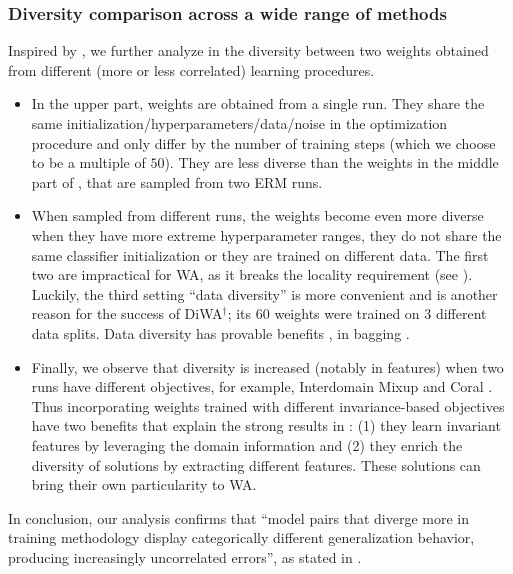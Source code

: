 \subsubsection{Diversity comparison across a wide range of methods}
\label{app:more_diversity_comparison}
Inspired by \cite{gontijolopes2022no}, we further analyze in  the diversity between two weights obtained from different (more or less correlated) learning procedures.
\begin{itemize}
    \item In the upper part, weights are obtained from a single run. They share the same initialization/hyperparameters/data/noise in the optimization procedure and only differ by the number of training steps (which we choose to be a multiple of $50$). They are less diverse than the weights in the middle part of , that are sampled from two ERM runs.
    \item  When sampled from different runs, the weights become even more diverse when they have more extreme hyperparameter ranges, they do not share the same classifier initialization or they are trained on different data. The first two are impractical for WA, as it breaks the locality requirement (see ).
          Luckily, the third setting \enquote{data diversity} is more convenient and is another reason for the success of DiWA$^{\dagger}$; its $60$ weights were trained on $3$ different data splits. Data diversity has provable benefits \cite{efron1992bootstrap}, \eg in bagging \cite{breiman1996bagging}.
    \item Finally, we observe that diversity is increased (notably in features) when two runs have different objectives, for example, Interdomain Mixup \cite{yan2020improve} and Coral \cite{coral216aaai}. Thus incorporating weights trained with different invariance-based objectives have two benefits that explain the strong results in : (1) they learn invariant features by leveraging the domain information and (2) they enrich the diversity of solutions by extracting different features. These solutions can bring their own particularity to WA.
\end{itemize}
In conclusion, our analysis confirms that \enquote{model pairs that diverge more in training methodology display categorically different generalization behavior, producing increasingly uncorrelated errors}, as stated in \cite{gontijolopes2022no}.


